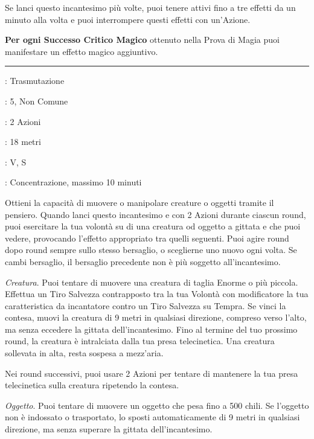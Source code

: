 \begin{multicols}{2}
Se lanci questo incantesimo più volte, puoi tenere attivi fino a tre effetti da un minuto alla volta e puoi interrompere questi effetti con un'Azione.

\textbf{Per ogni Successo Critico Magico} ottenuto nella Prova di Magia puoi manifestare un effetto magico aggiuntivo.

\smallskip\noindent\rule{\linewidth}{2pt} \hypertarget{Telecinesi}{}\medskip{}
\noindent
\begin{description}[noitemsep, topsep=0pt, parsep=0pt, partopsep=0pt, leftmargin=0cm, labelwidth=2.8cm]
	\item[\textbf{Lista di Magia}]: Trasmutazione
	\item[\textbf{Livello}]: 5, Non Comune
	\item[\textbf{T. di Lancio}]: 2 Azioni
	\item[\textbf{Gittata}]: 18 metri
	\item[\textbf{Componenti}]: V, S
	\item[\textbf{Durata}]: Concentrazione, massimo 10 minuti
\end{description}

Ottieni la capacità di muovere o manipolare creature o oggetti tramite il pensiero. Quando lanci questo incantesimo e con 2 Azioni durante ciascun round, puoi esercitare la tua volontà su di una creatura od oggetto a gittata e che puoi vedere, provocando l'effetto appropriato tra quelli seguenti. Puoi agire round dopo round sempre sullo stesso bersaglio, o sceglierne uno nuovo ogni volta. Se cambi bersaglio, il bersaglio precedente non è più soggetto all'incantesimo.

\emph{Creatura}. Puoi tentare di muovere una creatura di taglia Enorme o più piccola. Effettua un Tiro Salvezza contrapposto tra la tua Volontà con modificatore la tua caratteristica da incantatore contro un Tiro Salvezza su Tempra. Se vinci la contesa, muovi la creatura di 9 metri in qualsiasi direzione, compreso verso l'alto, ma senza eccedere la gittata dell'incantesimo. Fino al termine del tuo prossimo round, la creatura è intralciata dalla tua presa telecinetica. Una creatura sollevata in alta, resta sospesa a mezz'aria.

Nei round successivi, puoi usare 2 Azioni per tentare di mantenere la tua presa telecinetica sulla creatura ripetendo la contesa.

\emph{Oggetto}. Puoi tentare di muovere un oggetto che pesa fino a 500 chili. Se l'oggetto non è indossato o trasportato, lo sposti automaticamente di 9 metri in qualsiasi direzione, ma senza superare la gittata dell'incantesimo.


\end{multicols}
